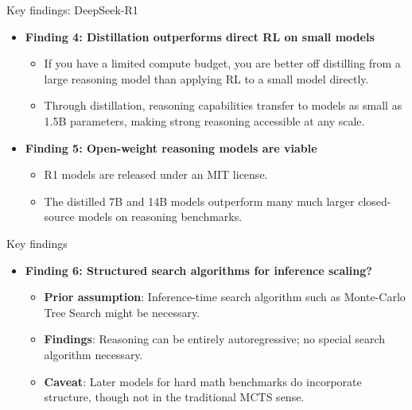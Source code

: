 \begin{frame}{Key findings: DeepSeek-R1}
  \begin{itemize}
    \item<1-> \textcolor{KAred}{\textbf{Finding 4: Distillation outperforms direct RL on small models}}
    \begin{itemize}
      \item If you have a limited compute budget, you are better off distilling from a large reasoning model than applying RL to a small model directly.
      \item Through distillation, reasoning capabilities transfer to models as small as 1.5B parameters, making strong reasoning accessible at any scale.
    \end{itemize}
    \item<2-> \textcolor{KAred}{\textbf{Finding 5: Open-weight reasoning models are viable}}
    \begin{itemize}
      \item R1 models are released under an MIT license.
      \item The distilled 7B and 14B models outperform many much larger closed-source models on reasoning benchmarks.
    \end{itemize}
  \end{itemize}
\end{frame}

\begin{frame}{Key findings}
  \begin{itemize}
    \item<1-> \textcolor{KAred}{\textbf{Finding 6: Structured search algorithms for inference scaling?}}\\
      \vspace{0.3em}
      \begin{itemize}
        \item \textbf{Prior assumption}: Inference-time search algorithm such as Monte-Carlo Tree Search might be necessary.
        \item \textbf{Findings}: Reasoning can be entirely autoregressive; no special search algorithm necessary.
        \item \textbf{Caveat}: Later models for hard math benchmarks do incorporate structure, though not in the traditional MCTS sense.
      \end{itemize}
  \end{itemize}
\end{frame}

